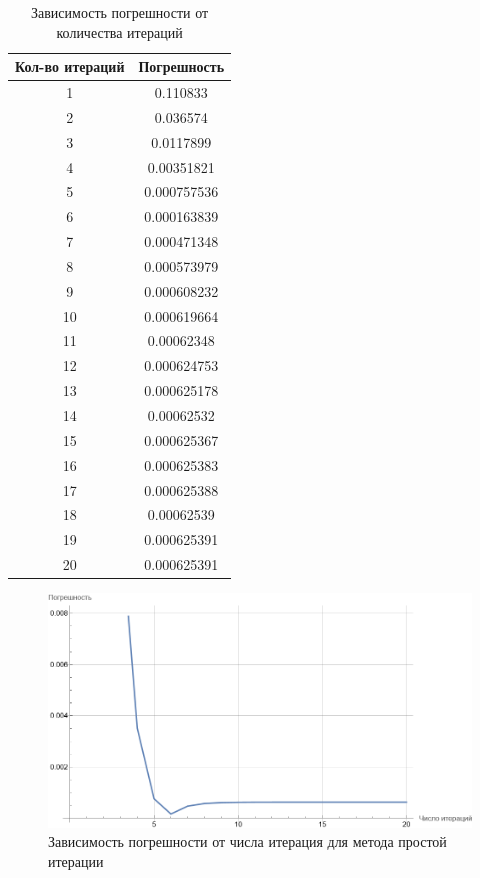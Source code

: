 \documentclass{article}
\begin{document}
				\begin{table}[H]
		\centering
		\caption{Зависимость погрешности от количества итераций}
		\begin{tabular}{|c|c|}
			\hline
			Кол-во итераций & Погрешность \\ \hline
			1 & 0.110833\\ \hline
			2 & 0.036574\\ \hline
			3 & 0.0117899\\ \hline
			4 & 0.00351821\\ \hline
			5 & 0.000757536\\ \hline
			6 & 0.000163839\\ \hline
			7 & 0.000471348\\ \hline
			8 & 0.000573979\\ \hline
			9 & 0.000608232\\ \hline
			10 & 0.000619664\\ \hline
			11 & 0.00062348\\ \hline
			12 & 0.000624753\\ \hline
			13 & 0.000625178\\ \hline
			14 & 0.00062532\\ \hline
			15 & 0.000625367\\ \hline
			16 & 0.000625383\\ \hline
			17 & 0.000625388\\ \hline
			18 & 0.00062539\\ \hline
			19 & 0.000625391\\ \hline
			20 & 0.000625391\\ \hline
		\end{tabular}
	\end{table}
	\begin{figure}[H]
        \centering
        \includegraphics[width=\textwidth]{iterationImage.png}
        \caption{Зависимость погрешности от числа итерация для метода простой итерации}
    \end{figure}
\end{document}
